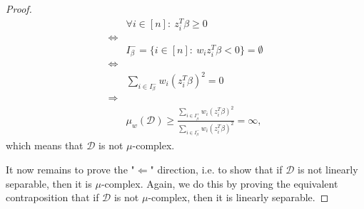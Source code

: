 \begin{proof}
\begin{align*}
                    & \forall i \in [n]:\ z_i^T\beta \geq 0                                                                                    \\
        \iff        &                                                                                                                          \\
                    & I_\beta^- = \{ i \in [n]:\ w_iz_i^T\beta < 0\} = \emptyset                                                               \\
        \iff        &                                                                                                                          \\
                    & \sum_{i \in I_\beta^-} w_i (z_i^T \beta)^2 = 0                                                                           \\
        \Rightarrow &                                                                                                                          \\
                    & \mu_w(\mathcal{D}) \geq \frac{\sum_{i \in I_\beta^+} w_i (z_i^T \beta)^2}
        {\sum_{i \in I_\beta^-} w_i (z_i^T \beta)^2} = \infty,
    \end{align*}
    which means that $\mathcal{D}$ is not $\mu$-complex.

    It now remains to prove the "$\Leftarrow$" direction, i.e. to
    show that if $\mathcal{D}$ is not linearly separable,
    then it is $\mu$-complex. Again, we do this by proving the
    equivalent contraposition that if $\mathcal{D}$ is not
    $\mu$-complex, then it is linearly separable.


\end{proof}
